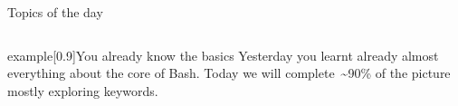 
\begin{frame}
    \titlepage
\end{frame}
\begin{frame}[label=toc,plain,noframenumbering]{Topics of the day}
    \medskip
    \begin{columns}[t]
        \begin{column}{.45\textwidth}
            \hspace*{4mm}
            \begin{minipage}[t][0.45\textheight]{\textwidth}
                \tableofcontents[sections={1-5}]
            \end{minipage}
        \end{column}
        \begin{column}{.45\textwidth}
            \begin{minipage}[t][0.45\textheight]{\textwidth}
                \tableofcontents[sections={6-}]
            \end{minipage}
        \end{column}
    \end{columns}
    \vspace{6mm}
    \begin{varblock}{example}[0.9\textwidth]{You already know the basics}
        Yesterday you learnt already almost everything about the core of Bash.
        Today we will complete \,\textasciitilde90\% of the picture mostly exploring keywords.
    \end{varblock}
\end{frame}
